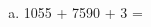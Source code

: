 \documentclass[a4paper,14pt]{article}
\begin{document}
\begin{multicols}{2}
\begin{enumerate}
\begin{enumerate}[a)]
				\item 1055 + 7590 + 3 = \\\\\\\\\\\\\\\\\\\\
			\end{enumerate}
        \end{enumerate}
    $~$ \\ $~$ \\ $~$ \\ $~$ \\ $~$ \\ $~$ \\ $~$ \\ $~$ \\ $~$ \\ $~$ \\ $~$ \\ $~$ \\ $~$ \\ $~$ \\ $~$ \\ $~$ \\ $~$ \\ $~$ \\ $~$ \\ $~$ \\ $~$ \\ $~$ \\ $~$ \\ $~$ \\ $~$ \\ $~$ \\ $~$ \\ $~$ \\ $~$ \\ $~$ \\ $~$ \\ $~$ \\ $~$ \\ $~$ \\ $~$ \\ $~$ \\ $~$ \\ $~$ \\ $~$ \\ $~$ \\ $~$ \\ $~$ \\ $~$ \\ $~$ \\ $~$ \\ $~$ \\ 
    \end{multicols}
\end{document}
